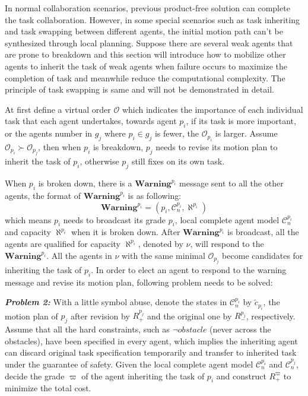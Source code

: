 \documentclass[journal]{IEEEtran}
\begin{document}
In normal collaboration scenarios, previous product-free solution can complete the task collaboration. However, in some special scenarios such as task inheriting and task swapping between different agents, the initial motion path can't be synthesized through local planning. Suppose there are several weak agents that are prone to breakdown and this section will introduce how to mobilize other agents to inherit the task of weak agents when failure occurs to maximize the completion of task and meanwhile reduce the computational complexity. The principle of task swapping is same and will not be demonstrated in detail.

At first define a virtual order $\mathcal{O}$ which indicates the importance of each individual task that each agent undertakes, towards agent $p_i$, if its task is more important, or the agents number in $g_j$ where $p_i \in g_j$ is fewer, the $\mathcal{O}_{p_i}$ is larger. Assume $\mathcal{O}_{p_i}\succ \mathcal{O}_{p_j}$, then when $p_i$ is breakdown, $p_j$ needs to revise its motion plan to inherit the task of $p_i$, otherwise $p_j$ still fixes on its own task.\par
When $p_i$ is broken down, there is a $\textbf{Warning}^{p_i}$ message sent to all the other agents, the format of $\textbf{Warning}^{p_i}$ is as following:
$$\textbf{Warning}^{p_i} = (p_i,\mathcal{C}^{p_i}_n,\aleph^{p_i})$$
which means $p_i$ needs to broadcast its grade $p_i$, local complete agent model $\mathcal{C}^{p_i}_n$ and capacity $\aleph^{p_i}$ when it is broken down. After $\textbf{Warning}^{p_i}$ is broadcast, all the agents are qualified for capacity $\aleph^{p_i}$, denoted by $\nu$, will respond to the $\textbf{Warning}^{p_i}$. All the agents in $\nu$ with the same minimal $\mathcal{O}_{p_j}$ become candidates for inheriting the task of $p_i$. In order to elect an agent to respond to the warning message and revise its motion plan, following problem needs to be solved:\par
\textbf{\emph{Problem 2:}} With a little symbol abuse, denote the states in $\mathcal{C}^{p_i}_n$ by $\tilde{c}_{p_i}$, the motion plan of $p_j$ after revision by $R^{p_j}_+$ and the original one by $R^{p_j}_-$, respectively. Assume that all the hard constraints, such as $\neg obstacle$ (never across the obstacles), have been specified in every agent, which implies the inheriting agent can discard original task specification temporarily and transfer to inherited task under the guarantee of safety. Given the local complete agent model $\mathcal{C}^{p_i}_n$ and $\mathcal{C}^{p_j}_n$, decide the grade $\varpi$ of the agent inheriting the task of $p_i$ and construct $R^{\varpi}_+$ to minimize the total cost. \par
\end{document}
